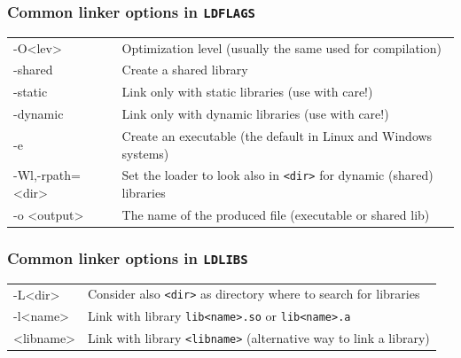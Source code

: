 \documentclass[10pt,aspectratio=169]{beamer}
\begin{document}
\begin{frame}
  \frametitle{Common linker  options in \texttt{LDFLAGS}}
 \hspace*{-0.5cm}
  \begin{tabular}{>{\ttfamily}l|p{}}
    -O<lev>& Optimization level (usually the same used for compilation)\\
    -shared & Create a shared library\\
    -static & Link only with static libraries (use with care!)\\
    -dynamic & Link only with dynamic libraries (use with care!)\\
    -e & Create an executable (the default in Linux and Windows  systems)\\
    -Wl,-rpath=<dir>& Set the loader to look also in \texttt{<dir>} for dynamic (shared) libraries\\
    -o <output>& The name of the produced file (executable or shared lib)
  \end{tabular}  
\end{frame}

\begin{frame}
  \frametitle{Common linker  options in \texttt{LDLIBS}}
 \hspace*{-0.5cm}
  \begin{tabular}{>{\ttfamily}l|p{}}
    -L<dir> & Consider also \texttt{<dir>} as directory where to search for libraries\\
    -l<name>& Link with library \texttt{lib<name>.so} or \texttt{lib<name>.a}\\
    <libname> & Link with library \texttt{<libname>} (alternative way to link a library)
  \end{tabular}  
\end{frame}
\end{document}

